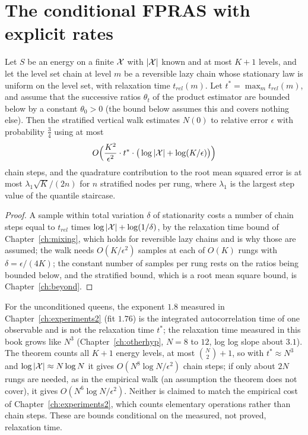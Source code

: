 \section{The conditional FPRAS with explicit rates}

\begin{theorem}
\label{thm:condfpras_rates}
Let $S$ be an energy on a finite $\mathcal{X}$ with $|\mathcal{X}|$ known and at most $K + 1$ levels, and let the level set chain at level $m$ be a reversible lazy chain whose stationary law is uniform on the level set, with relaxation time $t_{rel}(m)$. Let $t^* = \max_m t_{rel}(m)$, and assume that the successive ratios $\theta_t$ of the product estimator are bounded below by a constant $\theta_0 > 0$ (the bound below assumes this and covers nothing else). Then the stratified vertical walk estimates $N(0)$ to relative error $\epsilon$ with probability $\tfrac34$ using at most
\[
O\Big( \frac{K^2}{\epsilon^2} \cdot t^* \cdot \big( \log |\mathcal{X}| + \log(K / \epsilon) \big) \Big)
\]
chain steps, and the quadrature contribution to the root mean squared error is at most $\lambda_1 \sqrt{K} / (2n)$ for $n$ stratified nodes per rung, where $\lambda_1$ is the largest step value of the quantile staircase.
\end{theorem}

\begin{proof}
A sample within total variation $\delta$ of stationarity costs a number of chain steps equal to $t_{rel}$ times $\log|\mathcal{X}| + \log(1/\delta)$, by the relaxation time bound of Chapter~\ref{ch:mixing}, which holds for reversible lazy chains and is why those are assumed; the walk needs $O(K / \epsilon^2)$ samples at each of $O(K)$ rungs with $\delta = \epsilon / (4K)$; the constant number of samples per rung rests on the ratios being bounded below, and the stratified bound, which is a root mean square bound, is Chapter~\ref{ch:beyond}.
\end{proof}

For the unconditioned queens, the exponent $1.8$ measured in Chapter~\ref{ch:experiments2} (fit $1.76$) is the integrated autocorrelation time of one observable and is not the relaxation time $t^*$; the relaxation time measured in this book grows like $N^{3}$ (Chapter~\ref{ch:otherhyp}, $N = 8$ to $12$, log log slope about $3.1$). The theorem counts all $K + 1$ energy levels, at most $\binom N2 + 1$, so with $t^* \approx N^3$ and $\log|\mathcal{X}| \approx N \log N$ it gives $O(N^{8} \log N / \epsilon^2)$ chain steps; if only about $2N$ rungs are needed, as in the empirical walk (an assumption the theorem does not cover), it gives $O(N^{6} \log N / \epsilon^2)$. Neither is claimed to match the empirical cost of Chapter~\ref{ch:experiments2}, which counts elementary operations rather than chain steps. These are bounds conditional on the measured, not proved, relaxation time.

